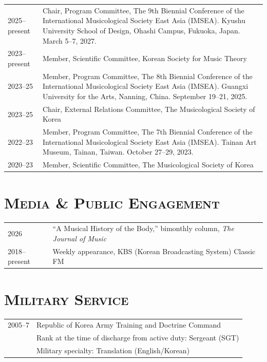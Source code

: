 \documentclass[a4paper,11pt,draft]{article}
\begin{document}
  \hspace*{-0.25cm}
  \begin{tabular}{p{2.5cm} p{12.5cm}}
    2025--present & Chair, Program Committee, The 9th Biennial Conference of the International Musicological Society East Asia (IMSEA). Kyushu University School of Design, Ohashi Campus, Fukuoka, Japan. March 5--7, 2027.\\[2mm]
    
    2023--present & Member, Scientific Committee, Korean Society for Music Theory\\[2mm]
    
    2023--25 & Member, Program Committee, The 8th Biennial Conference of the International Musicological Society East Asia (IMSEA). Guangxi University for the Arts, Nanning, China. September 19--21, 2025.\\[2mm]
    
    2023--25 & Chair, External Relations Committee, The Musicological Society of Korea\\[2mm]
    
    2022--23 & Member, Program Committee, The 7th Biennial Conference of the International Musicological Society East Asia (IMSEA). Tainan Art Museum, Tainan, Taiwan. October 27--29, 2023.\\[2mm]
    
    2020--23 & Member, Scientific Committee, The Musicological Society of Korea
  \end{tabular}
  
  \vspace*{5mm}
  
  \section*{\textsc{Media \& Public Engagement}}
  
  \hspace*{-0.25cm}
  \begin{tabular}{p{2.5cm} l}
    2026 & ``A Musical History of the Body,'' bimonthly column, 
\textit{The Journal of Music}\\
    
    2018--present & Weekly appearance, KBS (Korean Broadcasting System)
    Classic FM
  \end{tabular}
  
  \vspace*{5mm}
  
  \section*{\textsc{Military Service}}
  
  \hspace*{-0.25cm}
  \begin{tabular}{p{2.5cm} l}
    2005--7 & Republic of Korea Army Training and Doctrine
    Command\\
    & Rank at the time of discharge from active duty: Sergeant (SGT)\\
    & Military specialty: Translation (English/Korean)
  \end{tabular}
\end{document}
